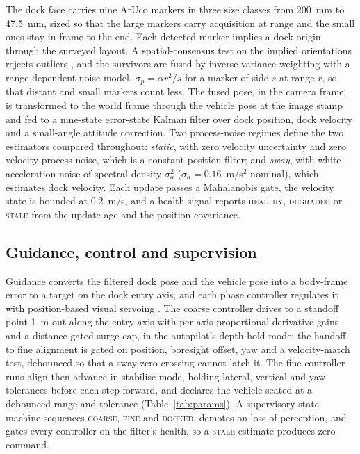 The dock face carries nine ArUco markers \cite{garrido2014automatic} in three size classes from 200~mm to 47.5~mm, sized so that the large markers carry acquisition at range and the small ones stay in frame to the end. Each detected marker implies a dock origin through the surveyed layout. A spatial-consensus test on the implied orientations rejects outliers \cite{kim2024enhancing}, and the survivors are fused by inverse-variance weighting \cite{xu2021underwater} with a range-dependent noise model, $\sigma_p = \alpha r^2/s$ for a marker of side $s$ at range $r$, so that distant and small markers count less. The fused pose, in the camera frame, is transformed to the world frame through the vehicle pose at the image stamp and fed to a nine-state error-state Kalman filter over dock position, dock velocity and a small-angle attitude correction. Two process-noise regimes define the two estimators compared throughout: \emph{static}, with zero velocity uncertainty and zero velocity process noise, which is a constant-position filter; and \emph{sway}, with white-acceleration noise of spectral density $\sigma_a^2$ ($\sigma_a = 0.16$~m/s$^2$ nominal), which estimates dock velocity. Each update passes a Mahalanobis gate, the velocity state is bounded at 0.2~m/s, and a health signal reports \textsc{healthy}, \textsc{degraded} or \textsc{stale} from the update age and the position covariance.

\subsection{Guidance, control and supervision}

Guidance converts the filtered dock pose and the vehicle pose into a body-frame error to a target on the dock entry axis, and each phase controller regulates it with position-based visual servoing \cite{chaumette2006visual}. The coarse controller drives to a standoff point 1~m out along the entry axis with per-axis proportional-derivative gains and a distance-gated surge cap, in the autopilot's depth-hold mode; the handoff to fine alignment is gated on position, boresight offset, yaw and a velocity-match test, debounced so that a sway zero crossing cannot latch it. The fine controller runs align-then-advance in stabilise mode, holding lateral, vertical and yaw tolerances before each step forward, and declares the vehicle seated at a debounced range and tolerance (Table~\ref{tab:params}). A supervisory state machine sequences \textsc{coarse}, \textsc{fine} and \textsc{docked}, demotes on loss of perception, and gates every controller on the filter's health, so a \textsc{stale} estimate produces zero command.

